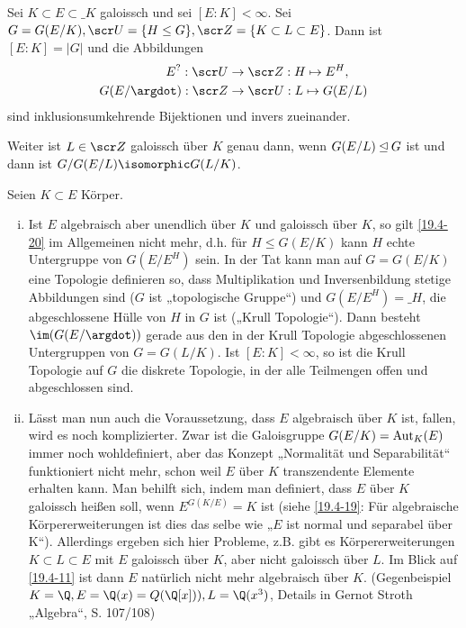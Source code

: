 \begin{kor} \label{19.4-21}
	Sei $K \subset E \subset \_K$ galoissch und sei $[E : K] < \infty$.
	Sei $G = G(E / K), \scr U = \{H \le G\}, \scr Z = \{ K \subset L \subset E \}$.
	Dann ist $[E : K] = |G|$ und die Abbildungen
	\begin{align*}
		E^?: \scr U &\to \scr Z: H \mapsto E^H, \\
		G(E / \argdot) : \scr Z &\to \scr U : L \mapsto G(E / L)
	\end{align*}
	sind inklusionsumkehrende Bijektionen und invers zueinander.

	Weiter ist $L \in \scr Z$ galoissch über $K$ genau dann, wenn $G(E / L) \mathbin{\trianglelefteq} G$ ist und dann ist $G / G(E / L) \isomorphic G(L / K)$.
\end{kor}

\begin{nt} \label{19.4-22}
	Seien $K \subset E$ Körper.
	\begin{enumerate}[i)]
		\item
			Ist $E$ algebraisch aber unendlich über $K$ und galoissch über $K$, so gilt \ref{19.4-20} im Allgemeinen nicht mehr, d.h. für $H \le G(E / K)$ kann $H$ echte Untergruppe von $G(E / E^H)$ sein.
			In der Tat kann man auf $G = G(E / K)$ eine Topologie definieren so, dass Multiplikation und Inversenbildung stetige Abbildungen sind ($G$ ist „topologische Gruppe“) und $G(E / E^H) = \_H$, die abgeschlossene Hülle von $H$ in $G$ ist („Krull Topologie“).
			Dann besteht $\im(G(E / \argdot))$ gerade aus den in der Krull Topologie abgeschlossenen Untergruppen von $G = G(L / K)$.
			Ist $[E : K] < \infty$, so ist die Krull Topologie auf $G$ die diskrete Topologie, in der alle Teilmengen offen und abgeschlossen sind.
		\item
			Lässt man nun auch die Voraussetzung, dass $E$ algebraisch über $K$ ist, fallen, wird es noch komplizierter.
			Zwar ist die Galoisgruppe $G(E / K) = \operatorname{Aut}_K(E)$ immer noch wohldefiniert, aber das Konzept „Normalität und Separabilität“ funktioniert nicht mehr, schon weil $E$ über $K$ transzendente Elemente erhalten kann.
			Man behilft sich, indem man definiert, dass $E$ über $K$ galoissch heißen soll, wenn $E^{G(K / E)} = K$ ist (siehe \ref{19.4-19}: Für algebraische Körpererweiterungen ist dies das selbe wie „$E$ ist normal und separabel über K“).
			Allerdings ergeben sich hier Probleme, z.B. gibt es Körpererweiterungen $K \subset L \subset E$ mit $E$ galoissch über $K$, aber nicht galoissch über $L$.
			Im Blick auf \ref{19.4-11} ist dann $E$ natürlich nicht mehr algebraisch über $K$.
			(Gegenbeispiel $K = \Q, E = \Q(x) = Q(\Q[x])), L = \Q(x^3)$, Details in Gernot Stroth „Algebra“, S. 107/108) %
	\end{enumerate}
\end{nt}

